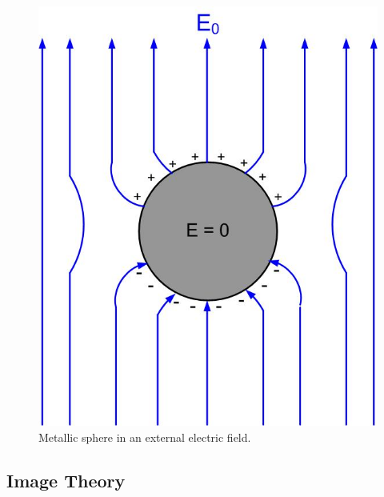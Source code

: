 \documentclass{ximera}
\begin{document}
\begin{figure}[htbp]
\begin{center}
\includegraphics[scale=0.5]{../jpg/metalsphereinefield.jpg}
\end{center}
\caption{Metallic sphere in an external electric field.}
\label{BoundaryConditionMetal}
\end{figure}








\subsection{Image Theory}
\end{document}

